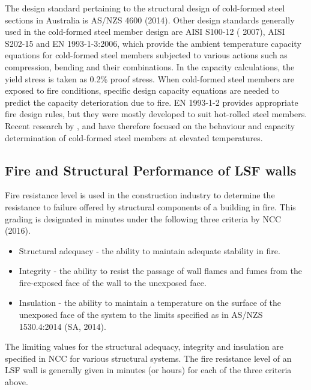 The design standard pertaining to the structural design of cold-formed steel sections in Australia is AS/NZS 4600 (2014). Other design standards generally used in the cold-formed steel member design are AISI S100-12 ( 2007), AISI S202-15 and EN 1993-1-3:2006, which  provide the ambient temperature capacity equations for cold-formed steel members subjected to various actions such as compression, bending and their combinations. In the capacity calculations, the yield stress is taken as 0.2\% proof stress. When cold-formed steel members are exposed to fire conditions, specific design capacity equations are needed to predict the capacity deterioration due to fire. EN 1993-1-2 provides appropriate fire design rules, but they were mostly developed to suit hot-rolled steel members. Recent research by \citet{Ranawaka2009a}, \citet{Kankanamge2011} and \citet{Rokilan2019} have therefore focused on the behaviour and capacity determination of cold-formed steel members at elevated temperatures.

\subsection{Fire and Structural Performance of LSF walls}

Fire resistance level is used in the construction industry to determine the resistance to failure offered by structural components of a building in fire. This grading is designated in minutes under the following three criteria by NCC (2016).

\begin{itemize}
\item Structural adequacy - the ability to maintain adequate stability in fire.
\item Integrity - the ability to resist the passage of wall flames and fumes from the fire-exposed face of the wall to the unexposed face. 
\item Insulation - the ability to maintain a temperature on the surface of the unexposed face of the system to the limits specified as in AS/NZS 1530.4:2014 (SA, 2014).
\end{itemize}

The limiting values for the structural adequacy, integrity and insulation are specified in  NCC for various structural systems. The fire resistance level of an LSF wall is generally given in minutes (or hours) for each of the three criteria above.

